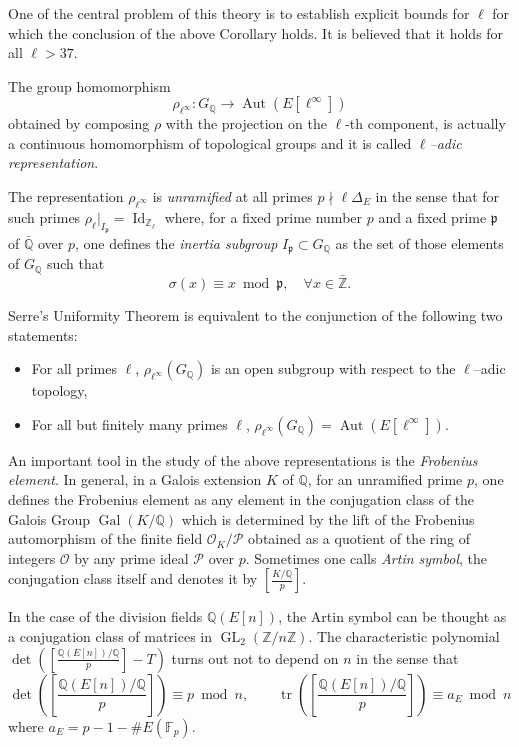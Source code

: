 \documentclass[a4paper,10pt]{article}
\newcommand{\Z}{\mathbb{Z}}
\newcommand{\F}{\mathbb{F}}
\newcommand{\Q}{\mathbb{Q}}
\begin{document}
One of the central problem of this theory is to establish explicit bounds for $\ell$ for which the conclusion of 
the above Corollary holds. It is believed that it holds for all $\ell>37$.

The group homomorphism
$$\rho_{\ell^\infty}: G_\Q\rightarrow\operatorname{Aut}(E[\ell^\infty])$$
obtained by composing $\rho$ with the projection on the $\ell$-th component,
is actually a continuous homomorphism of topological groups and it is called \emph{$\ell$--adic representation}.

The representation $\rho_{\ell^\infty}$ is \emph{unramified} at all primes $p\nmid \ell\Delta_E$ in the sense that for such primes
$\rho_\ell|_{I_\mathfrak p}=\operatorname{Id}_{\Z_\ell}$
where, for a fixed prime number $p$ and a fixed prime $\mathfrak p$ of $\bar{\Q}$ over $p$, one defines the \emph{inertia subgroup} 
$I_\mathfrak p\subset G_\Q$ as the set of those elements of $G_\Q$ such that
$$\sigma(x)\equiv x\bmod\mathfrak p,\quad \forall x\in\bar{\Z}.$$

Serre's Uniformity Theorem is equivalent to the conjunction of the following two statements:
\begin{itemize}
 \item For all primes $\ell$, $\rho_{\ell^\infty}(G_\Q)$ is an open subgroup with respect to the $\ell$--adic topology,
 \item For all but finitely many primes $\ell$, $\rho_{\ell^\infty}(G_\Q)=\operatorname{Aut}(E[\ell^\infty])$.
\end{itemize}

An important tool in the study of the above representations is the \emph{Frobenius element}. In general, in a Galois extension $K$
of $\Q$, for an unramified prime $p$, one defines the Frobenius element as any element in the conjugation class of the Galois Group 
$\operatorname{Gal}(K/\Q)$ which is determined by the lift of the Frobenius automorphism of the finite field 
$\mathcal O_K/\mathcal P$ obtained as a quotient of the ring of integers $\mathcal O$ by any 
prime ideal $\mathcal P$ over $p$. Sometimes one calls \emph{Artin symbol}, the conjugation class itself and denotes it
by $\left[\frac{K/\Q}p\right]$.

In the case of the division fields $\Q(E[n])$, the Artin symbol can be thought as a conjugation class of matrices in $\operatorname{GL}_2(\Z/n\Z)$.
The characteristic polynomial 
$\det(\left[\frac{\Q(E[n])/\Q}p\right]-T)$
turns out not to depend on $n$ in the sense that
$$\det\left(\left[\frac{\Q(E[n])/\Q}p\right]\right)\equiv p\bmod n,\qquad \operatorname{tr}\left(\left[\frac{\Q(E[n])/\Q}p\right]\right)\equiv a_E\bmod n$$
where $a_E=p-1-\#E(\F_p)$.
\end{document}
